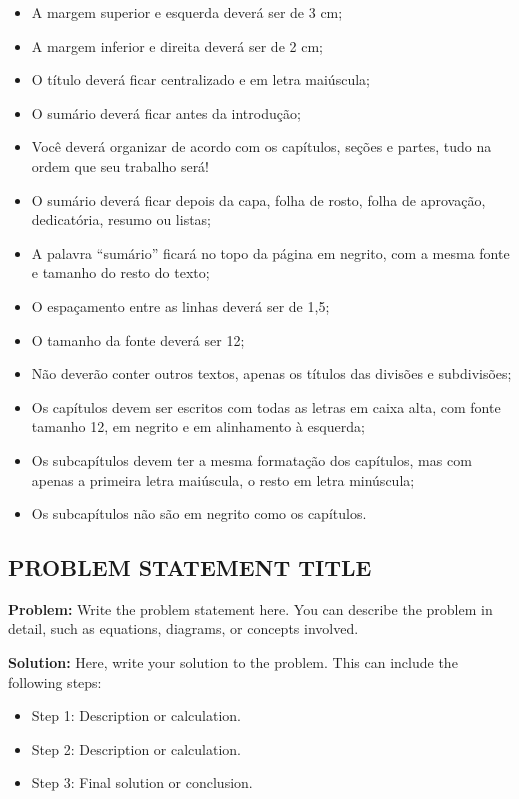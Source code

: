 \begin{itemize}
    \item A margem superior e esquerda deverá ser de 3 cm;
    \item A margem inferior e direita deverá ser de 2 cm;
    \item O título deverá ficar centralizado e em letra maiúscula;
    \item O sumário deverá ficar antes da introdução;
    \item Você deverá organizar de acordo com os capítulos, seções e partes, tudo na ordem que seu trabalho será!
    \item O sumário deverá ficar depois da capa, folha de rosto, folha de aprovação, dedicatória, resumo ou listas;
    \item A palavra “sumário” ficará no topo da página em negrito, com a mesma fonte e tamanho do resto do texto;
    \item O espaçamento entre as linhas deverá ser de 1,5;
    \item O tamanho da fonte deverá ser 12;
    \item Não deverão conter outros textos, apenas os títulos das divisões e subdivisões;
    \item Os capítulos devem ser escritos com todas as letras em caixa alta, com fonte tamanho 12, em negrito e em alinhamento à esquerda;
    \item Os subcapítulos devem ter a mesma formatação dos capítulos, mas com apenas a primeira letra maiúscula, o resto em letra minúscula;
    \item Os subcapítulos não são em negrito como os capítulos.
\end{itemize}


\subsection{PROBLEM STATEMENT TITLE}
\textbf{Problem:} Write the problem statement here. You can describe the problem in detail, such as equations, diagrams, or concepts involved.

\vspace{1em} %

\textbf{Solution:} Here, write your solution to the problem. This can include the following steps:
\begin{itemize}
    \item Step 1: Description or calculation.
    \item Step 2: Description or calculation.
    \item Step 3: Final solution or conclusion.
\end{itemize}

